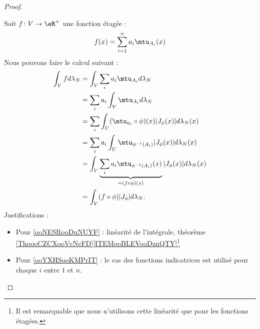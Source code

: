 \begin{proof}
\begin{enumerate}
\begin{subproof}
                   Soit \( f\colon V\to \eR^+\) une fonction étagée :
                   \begin{equation}
                       f(x)=\sum_{i=1}^na_i\mtu_{A_i}(x)
                   \end{equation}
                   Nous pouvons faire le calcul suivant :
                   \begin{subequations}
                       \begin{align}
                           \int_Vfd\lambda_N&=\int_V\sum_ia_i\mtu_{A_i}d\lambda_N\\
                           &=\sum_ia_i\int_{V}\mtu_{A_i}d\lambda_N      \label{ooNESRooDuNUYF}\\
                           &=\sum_i\int_U(\mtu_{a_i}\circ\phi)(x)| J_{\phi}(x) |d\lambda_N(x)   \label{ooYXHSooKMPrIT}\\
                           &=\sum_ia_i\int_U\mtu_{\phi^{-1}(A_i)}| J_{\phi}(x) |d\lambda_N(x)\\
                           &=\int_V\underbrace{\sum_ia_i\mtu_{\phi^{-1}(A_i)}(x)}_{=(f\circ\phi)(x)}| J_{\phi}(x) |d\lambda_N(x)\\
                           &=\int_V(f\circ\phi)| J_{\phi} |d\lambda_N.
                       \end{align}
                   \end{subequations}
                   Justifications :
                   \begin{itemize}
                       \item Pour \eqref{ooNESRooDuNUYF} : linéarité de l'intégrale, théorème \ref{ThoooCZCXooVvNcFD}\ref{ITEMooBLEVooDznQTY}\footnote{Il est remarquable que nous n'utilisons cette linéarité que pour les fonctions étagées.}
                       \item Pour \eqref{ooYXHSooKMPrIT} : le cas des fonctions indicatrices est utilisé pour chaque \( i\) entre \( 1\) et \( n\).
                   \end{itemize}


\end{subproof}
\end{enumerate}
\end{proof}
